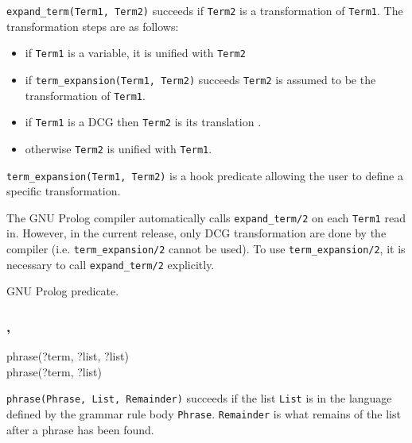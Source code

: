 \Description

\texttt{expand\_term(Term1, Term2)} succeeds if
\texttt{Term2} is a transformation of \texttt{Term1}. The transformation
steps are as follows:

\begin{itemize}

\item if \texttt{Term1} is a variable, it is unified with \texttt{Term2}

\item if \texttt{term\_expansion(Term1, Term2)} succeeds \texttt{Term2} is
  assumed to be the transformation of \texttt{Term1}.

\item if \texttt{Term1} is a DCG then \texttt{Term2} is its translation
  .

\item otherwise \texttt{Term2} is unified with \texttt{Term1}.

\end{itemize}

\texttt{term\_expansion(Term1, Term2)} is a hook predicate allowing the user
to define a specific transformation.

The GNU Prolog compiler  automatically calls
\texttt{expand\_term/2} on each \texttt{Term1} read in. However, in the
current release, only DCG transformation are done by the compiler (i.e.
\texttt{term\_expansion/2} cannot be used). To use
\texttt{term\_expansion/2}, it is necessary to call \texttt{expand\_term/2}
explicitly.

\PlErrorsNone

\Portability

GNU Prolog predicate.

\subsubsection{,
               }

\begin{TemplatesOneCol}
phrase(?term, ?list, ?list)\\
phrase(?term, ?list)

\end{TemplatesOneCol}

\Description

\texttt{phrase(Phrase, List, Remainder)} succeeds if the list
\texttt{List} is in the language defined by the grammar rule body
\texttt{Phrase}. \texttt{Remainder} is what remains of the list after a
phrase has been found.

